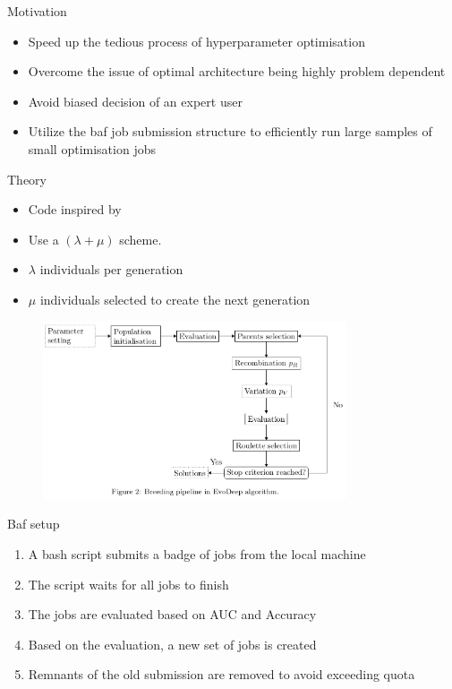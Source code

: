 \begin{frame}{Motivation}
	\begin{itemize}
		\item Speed up the tedious process of hyperparameter optimisation
		\item Overcome the issue of optimal architecture being highly problem dependent
		\item Avoid biased decision of an expert user
		\item Utilize the baf job submission structure to efficiently run large samples of small optimisation jobs
	\end{itemize}
\end{frame}

\begin{frame}{Theory}
	\begin{itemize}
		\item Code inspired by \cite{naranjo}
		\item Use a $(\lambda + \mu)$ scheme.
		\item $\lambda$ individuals per generation
		\item $\mu$ individuals selected to create the next generation
	\end{itemize}
	\begin{figure}
    	\centering
		\includegraphics[width=0.8\textwidth]{breed.png}
    \end{figure}
\end{frame}

\begin{frame}{Baf setup}
	\begin{enumerate}
		\item A bash script submits a badge of jobs from the local machine
		\item The script waits for all jobs to finish
		\item The jobs are evaluated based on AUC and Accuracy
		\item Based on the evaluation, a new set of jobs is created
		\item Remnants of the old submission are removed to avoid exceeding quota
	\end{enumerate}
\end{frame}

